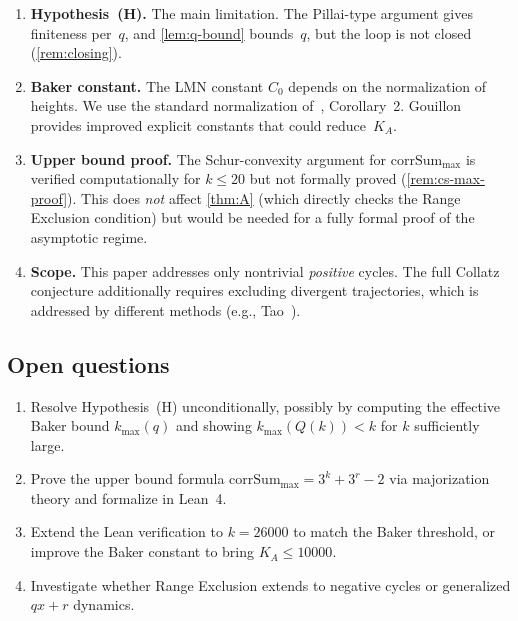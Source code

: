 \documentclass[11pt, a4paper]{amsart}
\theoremstyle{plain}
\theoremstyle{definition}
\theoremstyle{remark}
\newcommand{\corrSum}{\mathrm{corrSum}}
\begin{document}
\begin{enumerate}
  \item \textbf{Hypothesis~(H).}
    The main limitation.  The Pillai-type argument gives finiteness
    per~$q$, and \cref{lem:q-bound} bounds~$q$, but the loop is
    not closed (\cref{rem:closing}).

  \item \textbf{Baker constant.}
    The LMN constant $C_0$ depends on the normalization of heights.
    We use the standard normalization of~\cite{LMN1995}, Corollary~2.
    Gouillon~\cite{Gouillon2006} provides improved explicit constants
    that could reduce~$K_A$.

  \item \textbf{Upper bound proof.}
    The Schur-convexity argument for $\corrSum_{\max}$ is verified
    computationally for $k \leq 20$ but not formally proved
    (\cref{rem:cs-max-proof}).  This does \emph{not} affect
    \cref{thm:A} (which directly checks the Range Exclusion
    condition) but would be needed for a fully formal proof of
    the asymptotic regime.

  \item \textbf{Scope.}
    This paper addresses only nontrivial \emph{positive} cycles.
    The full Collatz conjecture additionally requires excluding
    divergent trajectories, which is addressed by different methods
    (e.g., Tao~\cite{Tao2022}).
\end{enumerate}

\subsection{Open questions}\label{ssec:open}

\begin{enumerate}
  \item Resolve Hypothesis~(H) unconditionally, possibly by
    computing the effective Baker bound $k_{\max}(q)$ and showing
    $k_{\max}(Q(k)) < k$ for $k$ sufficiently large.
  \item Prove the upper bound formula $\corrSum_{\max} = 3^k + 3^r - 2$
    via majorization theory and formalize in Lean~4.
  \item Extend the Lean verification to $k = 26000$ to match the
    Baker threshold, or improve the Baker constant to bring
    $K_A \leq 10000$.
  \item Investigate whether Range Exclusion extends to negative
    cycles or generalized $qx{+}r$ dynamics.
\end{enumerate}
\end{document}
